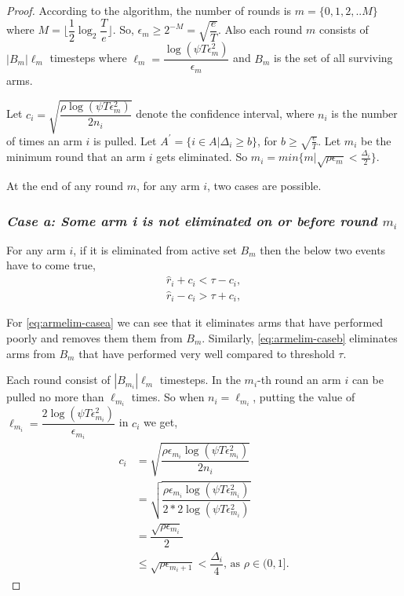 \begin{proof}

According to the algorithm, the number of rounds is $m=\lbrace 0,1,2,.. M\rbrace $ where $M=\bigg\lfloor \dfrac{1}{2}\log_{2} \dfrac{T}{e}\bigg\rfloor$. So, $\epsilon_{m}\geq 2^{-M} = \sqrt{\dfrac{e}{T}}$. Also each round $m$ consists of $|B_{m}|\ell_{m}$ timesteps where $\ell_{m} = \dfrac{\log(\psi T \epsilon_{m}^{2})}{\epsilon_{m}}$ and $B_{m}$ is the set of all surviving arms. 

Let $c_{i} = \sqrt{\dfrac{\rho\log{(\psi T\epsilon_{m}^{2})}}{2 n_{i}}}$ denote the confidence interval, where $n_{i}$ is the number of times an arm $i$ is pulled. Let $A^{'}=\lbrace i\in A|\Delta_{i}\geq b\rbrace$, for $b\geq \sqrt{\frac{e}{T}}$. Let $m_{i}$ be the minimum round that an arm $i$ gets eliminated. So $m_{i}=min\lbrace m| \sqrt{\rho\epsilon_{m}}<\frac{\Delta_{i}}{2}\rbrace$. 

At the end of any round $m$, for any arm $i$, two cases are possible.

\subsubsection{\textit{Case a: Some arm i is not eliminated on or before round $m_{i}$}}
For any arm $i$, if it is eliminated from active set $B_{m}$ then the below two events have to come true,
\begin{align}
\hat{r}_{i} + c_{i} < \tau - c_{i}, \label{eq:armelim-casea}\\
\hat{r}_{i} - c_{i} > \tau + c_{i}, \label{eq:armelim-caseb}
\end{align}

For \ref{eq:armelim-casea} we can see that it eliminates arms that have performed poorly and removes them them from $B_{m}$. Similarly, \ref{eq:armelim-caseb} eliminates arms from $B_{m}$ that have performed very well compared to threshold $\tau$.

Each round consist of $|B_{m_{i}}|\ell_{m}$ timesteps. In the $m_{i}$-th round an arm $i$ can be pulled no more than $\ell_{m_{i}}$ times. So when $n_{i}=\ell_{m_{i}}$, putting the value of $\ell_{m_{i}}=\dfrac{2\log{(\psi T\epsilon_{m_{i}}^{2})}}{\epsilon_{m_{i}}}$ in $c_{i}$ we get, 
\begin{align*}
c_{i}&=\sqrt{\dfrac{\rho\epsilon_{m_{i}}\log (\psi T\epsilon_{m_{i}}^{2})}{2 n_{i}}}\\
&=\sqrt{\dfrac{\rho\epsilon_{m_{i}}\log (\psi T\epsilon_{m_{i}}^{2})}{2*2 \log(\psi T\epsilon_{m_{i}}^{2})}}\\
& =\dfrac{\sqrt{\rho\epsilon_{m_{i}}}}{2}\\
& \leq \sqrt{\rho\epsilon_{m_{i}+1}} < \dfrac{\Delta_{i}}{4} \text{, as }\rho\in (0,1].
\end{align*}


\end{proof}
